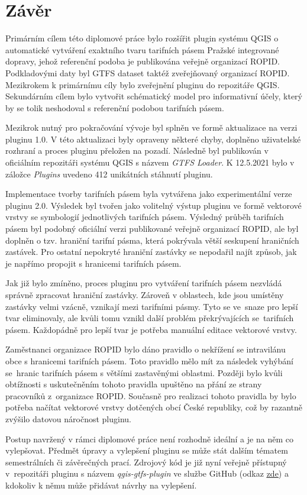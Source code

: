 \chapter*{Závěr}
\label{6-zaver}

Primárním cílem této diplomové práce bylo rozšířit plugin systému QGIS 
o automa\-tické vytváření exaktního tvaru tarifních pásem Pražské integrované dopravy, 
jehož referenční podoba je publikována veřejně organizací ROPID.  
Podkladovými daty byl GTFS dataset taktéž zveřejňovaný organizací ROPID.
Mezikrokem k primárnímu cíly bylo zveřejnění pluginu do repozitáře QGIS. Sekundárním cílem bylo vytvořit schématický model pro 
informativní účely, který by se tolik neshodoval s referenční podobou tarifních pásem.

Mezikrok nutný pro pokračování vývoje byl splněn ve formě aktualizace na verzi pluginu 1.0.
V této aktualizaci byly opraveny některé chyby, doplněno uživatelské rozhraní a proces pluginu přeložen na pozadí. 
Následně byl publikován v oficiálním repozitáři systému QGIS s názvem \textit{GTFS Loader}. 
K 12.5.2021 bylo v záložce \textit{Plugins} uvedeno 412 unikátních stáhnutí pluginu.

Implementace tvorby tarifních pásem byla vytvářena jako experimentální verze pluginu 2.0. Výsledek
byl tvořen jako volitelný výstup pluginu ve formě vektorové vrstvy se symbologií jednotlivých tarifních pásem.
Výsledný průběh tarifních pásem byl podobný oficiální verzi publikované veřejně organizací ROPID, ale byl doplněn o tzv. hraniční tarifní pásma,
která pokrývala větší seskupení hraničních zastávek. Pro ostatní nepokryté hraniční zastávky 
se nepodařil najít způsob, jak je napřímo propojit s hranicemi tarifních pásem.

Jak již bylo zmíněno, proces pluginu pro vytváření tarifních pásem nezvládá správně zpracovat hraniční zastávky.
Zároveň v oblastech, kde jsou umístěny zastávky velmi vzácně, vznikají  mezi tarifními pásmy.
Tyto  se ve~snaze pro lepší tvar eliminovaly, ale kvůli tomu vznikl další problém překrývajících se~ta\-rifních pásem.
Každopádně pro lepší tvar je potřeba manuální editace vektorové vrstvy.

Zaměstnanci organizace ROPID bylo dáno pravidlo o nekřížení se intravilánu obce s hranicemi tarifních pásem.
Toto pravidlo mělo mít za následek vyhýbání se~hranic tarifních pásem s většími zastavěnými oblastmi.
Později bylo kvůli obtíž\-nosti s uskutečněním tohoto pravidla upuštěno na přání ze strany pracovníků z~organizace ROPID.
Současně pro realizaci tohoto pravidla by bylo potřeba načítat vektorové vrstvy
dotčených obcí České republiky, což by razantně zvýšilo datovou náročnost pluginu.

Postup navržený v rámci diplomové práce není rozhodně ideální a je na něm co vylepšovat. Předmět úpravy a vylepšení pluginu
se může stát dalším tématem semestrálních či závěrečných prací. Zdrojový kód
je již nyní veřejně přístupný v~repozitáři pluginu s názvem \textit{qgis-gtfs-plugin} ve službe GitHub (odkaz \href{https://github.com/ctu-geoforall-lab/qgis-gtfs-plugin/tree/pid\_zones}
{\underline{zde}}) a kdokoliv k němu může přidávat
návrhy na vylepšení.  

